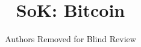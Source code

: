 \documentclass[conference]{styles/IEEEtran}
\begin{document}
%
\title{SoK: Bitcoin}


\author{Authors Removed for Blind Review}


% 
\end{document}
